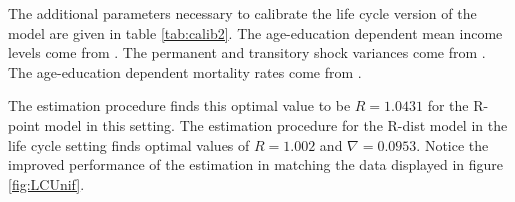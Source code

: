 \par The additional parameters necessary to calibrate the life cycle version of the model are given in table \ref{tab:calib2}. The age-education dependent mean income levels come from \cite{Cagetti2003}. The permanent and transitory shock variances come from \cite{Sabelhaus2010}. The age-education dependent mortality rates come from \cite{Brown2007}.

\unskip

\par The estimation procedure finds this optimal value to be $R = 1.0431$ for the R-point model in this setting. The estimation procedure for the R-dist model in the life cycle setting finds optimal values of $R = 1.002$ and $\nabla =0.0953$. Notice the improved performance of the estimation in matching the data displayed in figure \ref{fig:LCUnif}.

